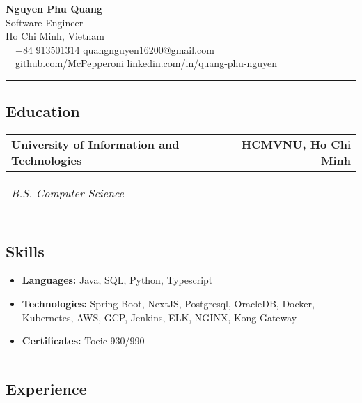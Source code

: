 \documentclass[11pt,letterpaper]{article}
\makeatletter
\newcommand{\headerrow}[2]
{\begin{tabular*}{\linewidth}{l@{\extracolsep{\fill}}r}
#1 &
#2 \\
\end{tabular*}}
\makeatother
\begin{document}
\begin{center}
    {\LARGE \textbf{Nguyen Phu Quang}}\\
    \vspace{0.2cm}
    Software Engineer\\
    \vspace{0.2cm}
    Ho Chi Minh, Vietnam
    \vspace{0.5cm}
    \\
    \raisebox{-0.2\height} {\Large \faPhoneSquare} \ \  +84 913501314 \hfill quangnguyen16200@gmail.com \ \ \raisebox{-0.2\height}{\Large \faEnvelopeSquare}
    \\
    \raisebox{-0.2\height}{\Large \faGithubSquare} \ \ github.com/McPepperoni \hfill linkedin.com/in/quang-phu-nguyen \raisebox{-0.2\height}{\Large \faLinkedinSquare}
\end{center}
\hrule
\vspace{-1em}
\subsection*{\Large Education}
\headerrow
{\textbf{University of Information and Technologies}}
{\textbf{HCMVNU, Ho Chi Minh}}
\headerrow
{\emph{B.S. Computer Science}}\\
\hrule
\vspace{-1em}
\subsection*{\Large Skills}
\begin{itemize}[leftmargin=1em,noitemsep]
    \item \textbf{Languages:}
          Java, SQL, Python, Typescript
    \item \textbf{Technologies:}
          Spring Boot, NextJS, Postgresql, OracleDB, Docker, Kubernetes, AWS, GCP, Jenkins, ELK, NGINX, Kong Gateway
    \item \textbf{Certificates:}
          Toeic 930/990
\end{itemize}
\hrule
\vspace{-1em}
\subsection*{\Large Experience}
\end{document}

